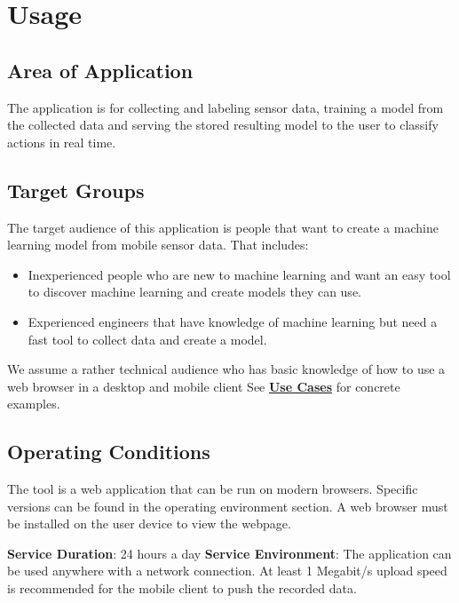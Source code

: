 \section{Usage}
\subsection{Area of Application}
The application is for collecting and labeling sensor data, training a model from the collected data and serving the stored resulting model to the user to classify actions in real time.

\subsection{Target Groups}
The target audience of this application is people that want to create a machine learning model from mobile sensor data. That includes:
\begin{itemize}
    \item Inexperienced people who are new to machine learning and want an easy tool to discover machine learning and create models they can use.
    \item Experienced engineers that have knowledge of machine learning but need a fast tool to collect data and create a model.
\end{itemize}
We assume a rather technical audience who has basic knowledge of how to use a web browser in a desktop and mobile client See \hyperref[Use Cases]{\textbf{Use Cases}} for concrete examples.

\subsection{Operating Conditions}
The tool is a web application that can be run on modern browsers. Specific versions can be found in the operating environment section. A web browser must be installed on the user device to view the webpage.

\textbf{Service Duration}: 24 hours a day
\newline
\newline
\textbf{Service Environment}: The application can be used anywhere with a network connection. At least 1 Megabit/s upload speed is recommended for the mobile client to push the recorded data.